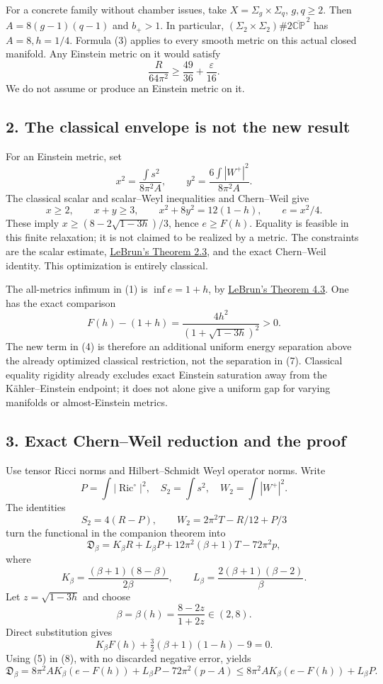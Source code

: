 \documentclass[
  11pt,
]{article}
\begin{document}
For a concrete family without chamber issues, take
\(X=\Sigma_g\times\Sigma_q\), \(g,q\ge2\). Then \(A=8(g-1)(q-1)\) and
\(b_+>1\). In particular,
\((\Sigma_2\times\Sigma_2)\#2\overline{\mathbb {CP}}^{\,2}\) has
\(A=8,h=1/4\). Formula (3) applies to every smooth metric on this actual
closed manifold. Any Einstein metric on it would satisfy \[
 \frac{R}{64\pi^2}\ge\frac{49}{36}+\frac{\varepsilon}{16}.
\] We do not assume or produce an Einstein metric on it.

\hypertarget{the-classical-envelope-is-not-the-new-result}{%
\subsection{2. The classical envelope is not the new
result}\label{the-classical-envelope-is-not-the-new-result}}

For an Einstein metric, set \[
 x^2=\frac{\int s^2}{8\pi^2A},\qquad
 y^2=\frac{6\int|W^+|^2}{8\pi^2A}.
\] The classical scalar and scalar--Weyl inequalities and Chern--Weil
give \[
 x\ge2,\qquad x+y\ge3,\qquad x^2+8y^2=12(1-h),\qquad e=x^2/4.
 \tag{6}
\] These imply \(x\ge(8-2\sqrt{1-3h})/3\), hence \(e\ge F(h)\). Equality
is feasible in this finite relaxation; it is not claimed to be realized
by a metric. The constraints are the scalar estimate,
\href{https://arxiv.org/pdf/math/0003068}{LeBrun's Theorem 2.3}, and the
exact Chern--Weil identity. This optimization is entirely classical.

The all-metrics infimum in (1) is \(\inf e=1+h\), by
\href{https://arxiv.org/pdf/math/0003068}{LeBrun's Theorem 4.3}. One has
the exact comparison \[
 F(h)-(1+h)=\frac{4h^2}{(1+\sqrt{1-3h})^2}>0.
 \tag{7}
\] The new term in (4) is therefore an additional uniform energy
separation above the already optimized classical restriction, not the
separation in (7). Classical equality rigidity already excludes exact
Einstein saturation away from the Kähler--Einstein endpoint; it does not
alone give a uniform gap for varying manifolds or almost-Einstein
metrics.

\hypertarget{exact-chernweil-reduction-and-the-proof}{%
\subsection{3. Exact Chern--Weil reduction and the
proof}\label{exact-chernweil-reduction-and-the-proof}}

Use tensor Ricci norms and Hilbert--Schmidt Weyl operator norms. Write
\[
 P=\int|\operatorname{Ric}^{\circ}|^2,\quad S_2=\int s^2,\quad
 W_2=\int|W^+|^2.
\] The identities \[
 S_2=4(R-P),\qquad W_2=2\pi^2T-R/12+P/3
\] turn the functional in the companion theorem into \[
 \mathfrak D_\beta
 =K_\beta R+L_\beta P+12\pi^2(\beta+1)T-72\pi^2p,
 \tag{8}
\] where \[
 K_\beta=\frac{(\beta+1)(8-\beta)}{2\beta},\qquad
 L_\beta=\frac{2(\beta+1)(\beta-2)}{\beta}.
\] Let \(z=\sqrt{1-3h}\) and choose \[
 \beta=\beta(h)=\frac{8-2z}{1+2z}\in(2,8).
 \tag{9}
\] Direct substitution gives \[
 K_\beta F(h)+\tfrac32(\beta+1)(1-h)-9=0.
\] Using (5) in (8), with no discarded negative error, yields \[
 \mathfrak D_\beta
 =8\pi^2A K_\beta(e-F(h))+L_\beta P-72\pi^2(p-A)
 \le8\pi^2A K_\beta(e-F(h))+L_\beta P.
 \tag{10}
\]
\end{document}
